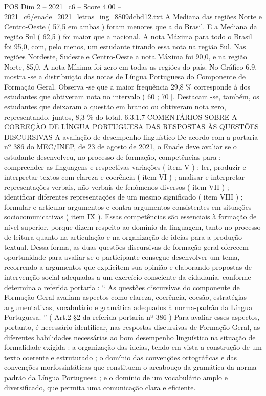 \begin{textsample}{POS Dim 2 – 2021\_c6 – Score 4.00 – 2021\_c6/enade\_2021\_letras\_ing\_8809dcbd12.txt}
A Mediana das regiões Norte e Centro-Oeste ( 57,5 em ambas ) foram menores que a do Brasil.
E a Mediana da região Sul ( 62,5 ) foi maior que a nacional.
A nota Máxima para todo o Brasil foi 95,0, com, pelo menos, um estudante tirando essa nota na região Sul.
Nas regiões Nordeste, Sudeste e Centro-Oeste a nota Máxima foi 90,0, e na região Norte, 85,0.
A nota Mínima foi zero em todas as regiões do país.
No Gráfico 6.9, mostra -se a distribuição das notas de Língua Portuguesa do Componente de Formação Geral.
Observa -se que a maior frequência 29,8 \% corresponde à dos estudantes que obtiveram nota no intervalo ( 60 ; 70 ].
Destacam -se, também, os estudantes que deixaram a questão em branco ou obtiveram nota zero, representando, juntos, 8,3 \% do total. 6.3.1.7 COMENTÁRIOS SOBRE A CORREÇÃO DE LÍNGUA PORTUGUESA DAS RESPOSTAS ÀS QUESTÕES DISCURSIVAS A avaliação de desempenho linguístico De acordo com a portaria nº 386 do MEC/INEP, de 23 de agosto de 2021, o Enade deve avaliar se o estudante desenvolveu, no processo de formação, competências para : compreender as linguagens e respectivas variações ( item V ) ; ler, produzir e interpretar textos com clareza e coerência ( item VI ) ; analisar e interpretar representações verbais, não verbais de fenômenos diversos ( item VII ) ; identificar diferentes representações de um mesmo significado ( item VIII ) ; formular e articular argumentos e contra-argumentos consistentes em situações sociocomunicativas ( item IX ).
Essas competências são essenciais à formação de nível superior, porque dizem respeito ao domínio da linguagem, tanto no processo de leitura quanto na articulação e na organização de ideias para a produção textual.
Dessa forma, as duas questões discursivas de formação geral oferecem oportunidade para avaliar se o participante consegue desenvolver um tema, recorrendo a argumentos que explicitem sua opinião e elaborando propostas de intervenção social adequadas a um exercício consciente da cidadania, conforme determina a referida portaria : “ As questões discursivas do componente de Formação Geral avaliam aspectos como clareza, coerência, coesão, estratégias argumentativas, vocabulário e gramática adequados à norma-padrão da Língua Portuguesa. ” ( Art.2 §2 da referida portaria nº 386 ) Para avaliar esses aspectos, portanto, é necessário identificar, nas respostas discursivas de Formação Geral, as diferentes habilidades necessárias ao bom desempenho linguístico na situação de formalidade exigida : a organização das ideias, tendo em vista a construção de um texto coerente e estruturado ; o domínio das convenções ortográficas e das convenções morfossintáticas que constituem o arcabouço da gramática da norma-padrão da Língua Portuguesa ; e o domínio de um vocabulário amplo e diversificado, que permita uma comunicação clara e eficiente.

\end{textsample}
